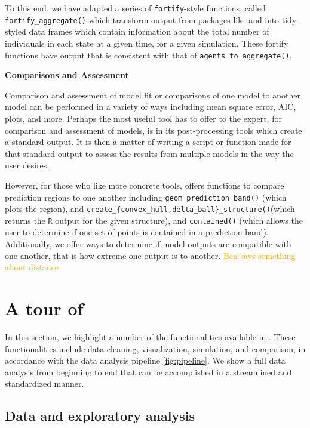 \documentclass[
  shortnames]{jss}
\begin{document}
To this end, we have adapted a series of \texttt{fortify}-style
functions, called \texttt{fortify\_aggregate()} which transform output
from packages like  and  into tidy-styled data
frames which contain information about the total number of individuals
in each state at a given time, for a given simulation. These fortify
functions have output that is consistent with that of
\texttt{agents\_to\_aggregate()}.

\textbf{Comparisons and Assessment}

Comparison and assessment of model fit or comparisons of one model to
another model can be performed in a variety of ways including mean
square error, AIC, plots, and more. Perhaps the most useful tool
 has to offer to the expert, for comparison and
assessment of models, is in its post-processing tools which create a
standard output. It is then a matter of writing a script or function
made for that standard output to assess the results from multiple models
in the way the user desires.

However, for those who like more concrete tools,  offers
functions to compare prediction regions to one another including
\texttt{geom\_prediction\_band()} (which plots the region), and
\texttt{create\_\{convex\_hull,delta\_ball\}\_structure()}(which returns
the \texttt{R} output for the given structure), and \texttt{contained()}
(which allows the user to determine if one set of points is contained in
a prediction band). Additionally, we offer ways to determine if model
outputs are compatible with one another, that is how extreme one output
is to another. \textcolor{orange}{Ben says something about distance}

\section[Tour]{A tour of }\label{sec:tour}

In this section, we highlight a number of the functionalities available
in . These functionalities include data cleaning,
visualization, simulation, and comparison, in accordance with the data
analysis pipeline \ref{fig:pipeline}. We show a full data analysis from
beginning to end that can be accomplished in a streamlined and
standardized manner.

\subsection{Data and exploratory analysis}
\end{document}
